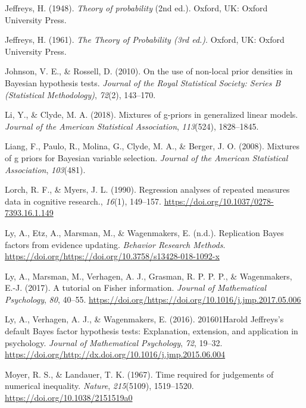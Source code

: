 \documentclass[english,,doc,floatsintext]{apa6}
\begin{document}
\leavevmode\hypertarget{ref-jeffreys1948theory2}{}%
Jeffreys, H. (1948). \emph{Theory of probability} (2nd ed.). Oxford, UK: Oxford University Press.

\leavevmode\hypertarget{ref-jeffreys1961}{}%
Jeffreys, H. (1961). \emph{The Theory of Probability (3rd ed.)}. Oxford, UK: Oxford University Press.

\leavevmode\hypertarget{ref-johnson2010use}{}%
Johnson, V. E., \& Rossell, D. (2010). On the use of non-local prior densities in Bayesian hypothesis tests. \emph{Journal of the Royal Statistical Society: Series B (Statistical Methodology)}, \emph{72}(2), 143--170.

\leavevmode\hypertarget{ref-li2018mixtures}{}%
Li, Y., \& Clyde, M. A. (2018). Mixtures of g-priors in generalized linear models. \emph{Journal of the American Statistical Association}, \emph{113}(524), 1828--1845.

\leavevmode\hypertarget{ref-liang2008mixtures}{}%
Liang, F., Paulo, R., Molina, G., Clyde, M. A., \& Berger, J. O. (2008). Mixtures of g priors for Bayesian variable selection. \emph{Journal of the American Statistical Association}, \emph{103}(481).

\leavevmode\hypertarget{ref-lorch1990}{}%
Lorch, R. F., \& Myers, J. L. (1990). Regression analyses of repeated measures data in cognitive research., \emph{16}(1), 149--157. \url{https://doi.org/10.1037/0278-7393.16.1.149}

\leavevmode\hypertarget{ref-ly2017replication}{}%
Ly, A., Etz, A., Marsman, M., \& Wagenmakers, E. (n.d.). Replication Bayes factors from evidence updating. \emph{Behavior Research Methods}. \url{https://doi.org/https://doi.org/10.3758/s13428-018-1092-x}

\leavevmode\hypertarget{ref-ly2017tutorial}{}%
Ly, A., Marsman, M., Verhagen, A. J., Grasman, R. P. P. P., \& Wagenmakers, E.-J. (2017). A tutorial on Fisher information. \emph{Journal of Mathematical Psychology}, \emph{80}, 40--55. \url{https://doi.org/https://doi.org/10.1016/j.jmp.2017.05.006}

\leavevmode\hypertarget{ref-ly2016harold}{}%
Ly, A., Verhagen, A. J., \& Wagenmakers, E. (2016). 201601Harold Jeffreys's default Bayes factor hypothesis tests: Explanation, extension, and application in psychology. \emph{Journal of Mathematical Psychology}, \emph{72}, 19--32. \url{https://doi.org/http://dx.doi.org/10.1016/j.jmp.2015.06.004}

\leavevmode\hypertarget{ref-moyer1967}{}%
Moyer, R. S., \& Landauer, T. K. (1967). Time required for judgements of numerical inequality. \emph{Nature}, \emph{215}(5109), 1519--1520. \url{https://doi.org/10.1038/2151519a0}
\end{document}
